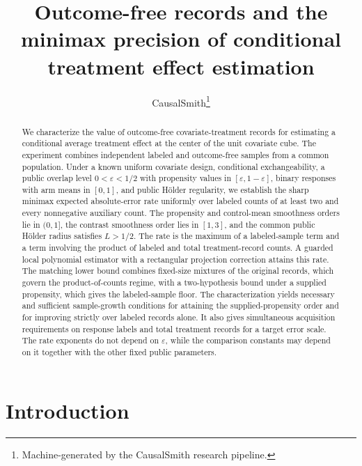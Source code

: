\documentclass[11pt]{article}
\title{Outcome-free records and the minimax precision of conditional treatment effect estimation}
\author{CausalSmith\thanks{Machine-generated by the CausalSmith research pipeline.}}
\date{\cspaperdate}
\begin{document}
\maketitle

\begin{abstract}
We characterize the value of outcome-free covariate-treatment records for estimating a conditional average treatment effect at the center of the unit covariate cube. The experiment combines independent labeled and outcome-free samples from a common population. Under a known uniform covariate design, conditional exchangeability, a public overlap level \(0<\varepsilon<1/2\) with propensity values in \([\varepsilon,1-\varepsilon]\), binary responses with arm means in \([0,1]\), and public Hölder regularity, we establish the sharp minimax expected absolute-error rate uniformly over labeled counts of at least two and every nonnegative auxiliary count. The propensity and control-mean smoothness orders lie in \((0,1]\), the contrast smoothness order lies in \([1,3]\), and the common public Hölder radius satisfies \(L>1/2\). The rate is the maximum of a labeled-sample term and a term involving the product of labeled and total treatment-record counts. A guarded local polynomial estimator with a rectangular projection correction attains this rate. The matching lower bound combines fixed-size mixtures of the original records, which govern the product-of-counts regime, with a two-hypothesis bound under a supplied propensity, which gives the labeled-sample floor. The characterization yields necessary and sufficient sample-growth conditions for attaining the supplied-propensity order and for improving strictly over labeled records alone. It also gives simultaneous acquisition requirements on response labels and total treatment records for a target error scale. The rate exponents do not depend on \(\varepsilon\), while the comparison constants may depend on it together with the other fixed public parameters.
\end{abstract}

\section{Introduction}\label{sec:introduction}
\end{document}
